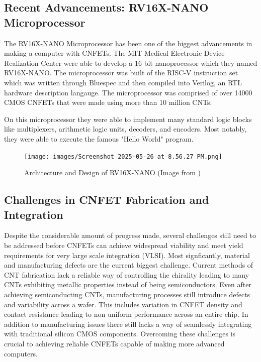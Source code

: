 \documentclass[sigconf]{acmart}
\begin{document}
\subsection{Recent Advancements: RV16X-NANO Microprocessor}
The RV16X-NANO Microprocessor has been one of the biggest advancements 
in making a computer with CNFETs. The MIT Medical Electronic Device 
Realization Center were able to develop a 16 bit nanoprocessor which
they named RV16X-NANO. The microprocessor was built of the RISC-V
instruction set which was written through Bluespec and then compiled 
into Verilog, an RTL hardware description langauge. The microprocessor 
was comprised of over 14000 CMOS CNFETs that were made using more than 
10 million CNTs. 

On this microprocessor they were able to implement many standard logic 
blocks like multiplexers, arithmetic logic units, decoders, and encoders. 
Most notably, they were able to execute the famous "Hello World"
program.
\cite{hills2019modern}

\begin{figure}
  \centering
  \texttt{[image: images/Screenshot 2025-05-26 at 8.56.27 PM.png]}
  \caption{Architecture and Design of RV16X-NANO (Image from \cite{hills2019modern})}
\end{figure}

\subsection{Challenges in CNFET Fabrication and Integration}
Despite the considerable amount of progress made, several challenges 
still need to be addressed before CNFETs can achieve widespread 
viability and meet yield requirements for very large scale integration
(VLSI). Most signficantly, material and manufacturing defects are 
the current biggest challenge. Current methods of CNT fabrication 
lack a reliable way of controlling the chirality leading to many
CNTs exhibiting metallic properties instead of being semiconductors. 
Even after achieving semiconducting CNTs, manufacturing processes still
introduce defects and variability across a wafer. This includes variation
in CNFET density and contact resistance leading to non uniform performance
across an entire chip. In addition to manufacturing issues there 
still lacks a way of seamlessly integrating with traditional silicon
CMOS components\cite{hills2019modern}.
Overcoming these challenges is crucial to achieving reliable CNFETs
capable of making more advanced computers. 
\end{document}
